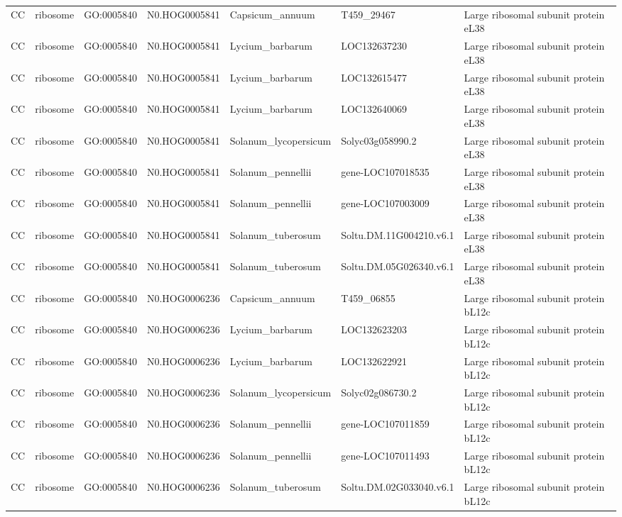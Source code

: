 \begin{table}
\begin{tabular}[t]{lllllll}
CC & ribosome & GO:0005840 & N0.HOG0005841 & Capsicum\_annuum & T459\_29467 & Large ribosomal subunit protein eL38\\
CC & ribosome & GO:0005840 & N0.HOG0005841 & Lycium\_barbarum & LOC132637230 & Large ribosomal subunit protein eL38\\
CC & ribosome & GO:0005840 & N0.HOG0005841 & Lycium\_barbarum & LOC132615477 & Large ribosomal subunit protein eL38\\
CC & ribosome & GO:0005840 & N0.HOG0005841 & Lycium\_barbarum & LOC132640069 & Large ribosomal subunit protein eL38\\
CC & ribosome & GO:0005840 & N0.HOG0005841 & Solanum\_lycopersicum & Solyc03g058990.2 & Large ribosomal subunit protein eL38\\
CC & ribosome & GO:0005840 & N0.HOG0005841 & Solanum\_pennellii & gene-LOC107018535 & Large ribosomal subunit protein eL38\\
CC & ribosome & GO:0005840 & N0.HOG0005841 & Solanum\_pennellii & gene-LOC107003009 & Large ribosomal subunit protein eL38\\
CC & ribosome & GO:0005840 & N0.HOG0005841 & Solanum\_tuberosum & Soltu.DM.11G004210.v6.1 & Large ribosomal subunit protein eL38\\
CC & ribosome & GO:0005840 & N0.HOG0005841 & Solanum\_tuberosum & Soltu.DM.05G026340.v6.1 & Large ribosomal subunit protein eL38\\
CC & ribosome & GO:0005840 & N0.HOG0006236 & Capsicum\_annuum & T459\_06855 & Large ribosomal subunit protein bL12c\\
CC & ribosome & GO:0005840 & N0.HOG0006236 & Lycium\_barbarum & LOC132623203 & Large ribosomal subunit protein bL12c\\
CC & ribosome & GO:0005840 & N0.HOG0006236 & Lycium\_barbarum & LOC132622921 & Large ribosomal subunit protein bL12c\\
CC & ribosome & GO:0005840 & N0.HOG0006236 & Solanum\_lycopersicum & Solyc02g086730.2 & Large ribosomal subunit protein bL12c\\
CC & ribosome & GO:0005840 & N0.HOG0006236 & Solanum\_pennellii & gene-LOC107011859 & Large ribosomal subunit protein bL12c\\
CC & ribosome & GO:0005840 & N0.HOG0006236 & Solanum\_pennellii & gene-LOC107011493 & Large ribosomal subunit protein bL12c\\
CC & ribosome & GO:0005840 & N0.HOG0006236 & Solanum\_tuberosum & Soltu.DM.02G033040.v6.1 & Large ribosomal subunit protein bL12c\\

\end{tabular}
\end{table}
